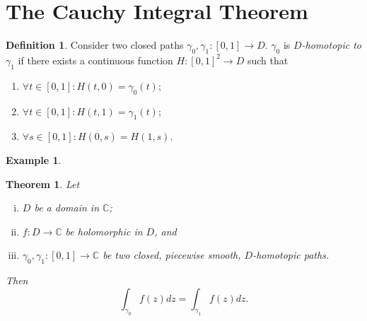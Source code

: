 \documentclass[12pt,openany]{book}
\newtheorem{theorem}{Theorem}[chapter]
\theoremstyle{definition}
\newtheorem{definition}{Definition}[chapter]
\newtheorem{example}{Example}[section]
\newcommand{\C}{\mathbb{C}}
\newcommand{\of}[1]{\left( #1 \right)}
\begin{document}
	
	\newpage
	\section{The Cauchy Integral Theorem}
	
	\begin{tcolorbox}[colback=white,colframe=defcolor,arc=5pt,title={\color{white}\bf Path Homotopy}]
		\begin{definition}
			Consider two closed paths $\gamma_0,\gamma_1:[0,1]\to D$. $\gamma_0$ is \textit{$D$-homotopic to} $\gamma_1$ if there exists a continuous function $H:[0,1]^2\to D$ such that \begin{enumerate}[(H1)]
				\item $\forall t\in[0,1]: H(t,0)=\gamma_0(t)$;
				\item $\forall t\in[0,1]: H(t,1)=\gamma_1(t)$;
				\item $\forall s\in[0,1]: H(0,s)=H(1,s)$.
			\end{enumerate}
		\end{definition}
	\end{tcolorbox}
	\vspace{8pt}
	\begin{example}
		
	\end{example}	
	\vspace{8pt}
	\begin{tcolorbox}[colback=white,colframe=thmcolor,arc=5pt,title={\color{white}\bf The Cauchy Integral Theorem}]
		\begin{theorem}
			Let \begin{enumerate}[(i)]
				\item $D$ be a domain in $\C$;
				\item $f:D\to\C$ be holomorphic in $D$, and
				\item $\gamma_0,\gamma_1:[0,1]\to\C$ be two closed, piecewise smooth, $D$-homotopic paths.
			\end{enumerate} Then \[
			\int_{\gamma_0}f\of{z}dz=\int_{\gamma_1}f\of{z}dz.
			\]
		\end{theorem}
	\end{tcolorbox}
\end{document}
